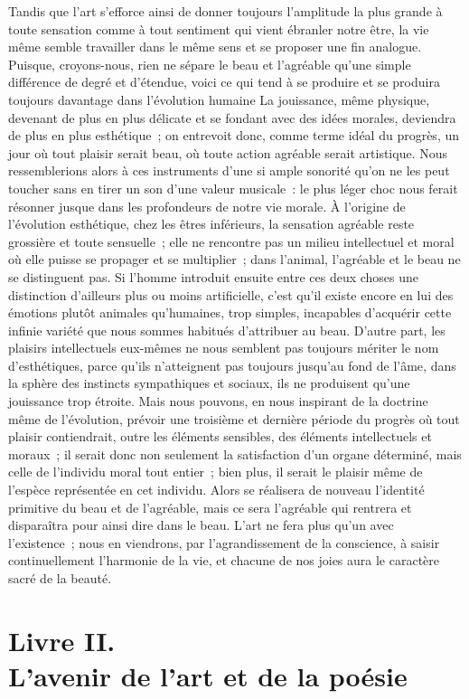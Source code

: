 \documentclass[french,twoside]{book} %
\begin{document}
Tandis que l’art s’efforce ainsi de donner toujours l’amplitude la plus grande à toute sensation comme à tout sentiment qui vient ébranler notre être, la vie même semble travailler dans le même sens et se proposer une fin analogue. Puisque, croyons-nous, rien ne sépare le beau et l’agréable qu’une simple différence de degré et d’étendue, voici ce qui tend à se produire et se produira toujours davantage dans l’évolution humaine La jouissance, même physique, devenant de plus en plus délicate et se fondant avec des idées morales, deviendra de plus en plus esthétique ; on entrevoit donc, comme terme idéal du progrès,  un jour où tout plaisir serait beau, où toute action agréable serait artistique. Nous ressemblerions alors à ces instruments d’une si ample sonorité qu’on ne les peut toucher sans en tirer un son d’une valeur musicale : le plus léger choc nous ferait résonner jusque dans les profondeurs de notre vie morale. À l’origine de l’évolution esthétique, chez les êtres inférieurs, la sensation agréable reste grossière et toute sensuelle ; elle ne rencontre pas un milieu intellectuel et moral où elle puisse se propager et se multiplier ; dans l’animal, l’agréable et le beau ne se distinguent pas. Si l’homme introduit ensuite entre ces deux choses une distinction d’ailleurs plus ou moins artificielle, c’est qu’il existe encore en lui des émotions plutôt animales qu’humaines, trop simples, incapables d’acquérir cette infinie variété que nous sommes habitués d’attribuer au beau. D’autre part, les plaisirs intellectuels eux-mêmes ne nous semblent pas toujours mériter le nom d’esthétiques, parce qu’ils n’atteignent pas toujours jusqu’au fond de l’âme, dans la sphère des instincts sympathiques et sociaux, ils ne produisent qu’une jouissance trop étroite. Mais nous pouvons, en nous inspirant de la doctrine même de l’évolution, prévoir une troisième et dernière période du progrès où tout plaisir contiendrait, outre les éléments sensibles, des éléments intellectuels et moraux ; il serait donc non seulement la satisfaction d’un organe déterminé, mais celle de l’individu moral tout entier ; bien plus, il serait le plaisir même de l’espèce représentée en cet individu. Alors se réalisera de nouveau l’identité primitive du beau et de l’agréable, mais ce sera l’agréable qui rentrera et  disparaîtra pour ainsi dire dans le beau. L’art ne fera plus qu’un avec l’existence ; nous en viendrons, par l’agrandissement de la conscience, à saisir continuellement l’harmonie de la vie, et chacune de nos joies aura le caractère sacré de la beauté.
\section[{Livre II. L’avenir de l’art et de la poésie}]{Livre II. \\
L’avenir de l’art et de la poésie}\renewcommand{\leftmark}{Livre II. \\
L’avenir de l’art et de la poésie}
\end{document}
